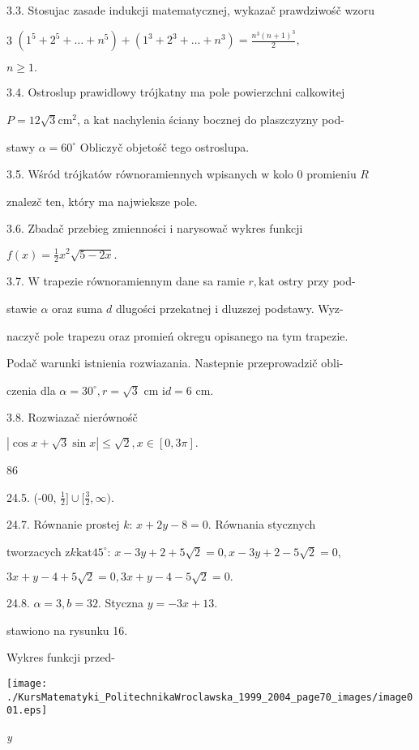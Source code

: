 \documentclass[a4paper,12pt]{article}
\begin{document}
3.3. Stosujac zasade indukcji matematycznej, wykazač prawdziwośč wzoru

3 $(1^{5}+2^{5}+\displaystyle \ldots+n^{5})+(1^{3}+2^{3}+\ldots+n^{3})=\frac{n^{3}(n+1)^{3}}{2},$

$n\geq 1.$

3.4. Ostroslup prawidlowy trójkatny ma pole powierzchni calkowitej

$P=12\sqrt{3}\mathrm{c}\mathrm{m}^{2}$, a $\mathrm{k}\mathrm{a}\mathrm{t}$ nachylenia ściany bocznej do plaszczyzny pod-

stawy $\alpha=60^{\circ}$ Obliczyč objetośč tego ostroslupa.

3.5. Wśród trójkatów równoramiennych wpisanych $\mathrm{w}$ kolo $0$ promieniu $R$

znalez$\acute{}$č ten, który ma najwieksze pole.

3.6. Zbadač przebieg zmienności $\mathrm{i}$ narysowač wykres funkcji

$f(x)=\displaystyle \frac{1}{2}x^{2}\sqrt{5-2x}.$

3.7. $\mathrm{W}$ trapezie równoramiennym dane sa ramie $r, \mathrm{k}\mathrm{a}\mathrm{t}$ ostry przy pod-

stawie $\alpha$ oraz suma $d$ dlugości przekatnej $\mathrm{i}$ dluzszej podstawy. Wyz-

naczyč pole trapezu oraz promień okregu opisanego na tym trapezie.

Podač warunki istnienia rozwiazania. Nastepnie przeprowadzič obli-

czenia dla $\alpha=30^{\circ}, r=\sqrt{3}$ cm $\mathrm{i} d=6$ cm.

3.8. Rozwiazač nierównośč

$|\cos x+\sqrt{3}\sin x|\leq\sqrt{2},x\in[0,3\pi].$





86

24.5. (-00, $\displaystyle \frac{1}{2}]\cup[\frac{3}{2},\infty).$

24.7. Równanie prostej $k$: $x+2y-8 = 0$. Równania stycznych

tworzacych $\mathrm{z} k \mathrm{k}\mathrm{a}\mathrm{t} 45^{\circ}$: $x-3y+2+5\sqrt{2}= 0, x-3y+2-5\sqrt{2}= 0,$

$3x+y-4+5\sqrt{2}=0, 3x+y-4-5\sqrt{2}=0.$

24.8. $\alpha=3, b=32$. Styczna $y= -3x+13.$

stawiono na rysunku 16.

Wykres funkcji przed-
\begin{center}
\texttt{[image: ./KursMatematyki\_PolitechnikaWroclawska\_1999\_2004\_page70\_images/image001.eps]}
\end{center}
{\it y}
\end{document}
